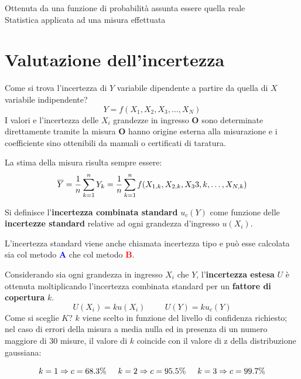 \documentclass[a4paper, 15pt]{article}
\begin{document}
\begin{adjustwidth}{2in}{}
	 	 \begin{tcolorbox}[colback=red!5!white,colframe=red!75!black,title=TIPO B]
	 	 	Ottenuta da una
	 	 	funzione di probabilità
	 	 	assunta essere quella reale \\
	 	 	Statistica applicata ad una misura effettuata
	 	 \end{tcolorbox}
\end{adjustwidth}
\section{Valutazione dell’incertezza}
\begin{adjustwidth}{2in}{}	 	 
 	 Come si trova l'incertezza di $Y$ variabile dipendente a partire da quella di $X$ variabile indipendente?
 	 \[Y = f(X_1, X_2, X_3, \dots, X_N)\]
 	 I valori e l'incertezza delle $X_i$ grandezze in ingresso \textbf{O} sono determinate direttamente tramite la misura \textbf{O} hanno origine esterna alla misurazione e i coefficiente sino ottenibili da manuali o certificati di taratura. \newline 
 	 
 	 La stima della misura risulta sempre essere:
 	 \[\overline{Y} = {1\over n}\sum_{k=1}^{n}Y_k = {1\over n}\sum_{k=1}^{n}f(X_{1,k}, X_{2,k}, X_3{3,k}, \dots, X_{N,k})\]
 	  	 	 
 	 Si definisce l'\textbf{incertezza combinata standard} $u_c(Y)$ come funzione delle \textbf{incertezze standard} relative ad ogni grandezza d'ingresso $u(X_i)$. 
 	 	
 	 L'incertezza standard viene anche chiamata incertezza tipo e può esse calcolata sia col metodo \textcolor{blue}{\textbf{A}} che col metodo \textcolor{red}{\textbf{B}}.\newline 
 	 
 	 Considerando sia ogni grandezza in ingresso $X_i$ che $Y$, l’\textbf{incertezza estesa} $U$ è ottenuta moltiplicando l’incertezza combinata standard per un \textbf{fattore di
 	 copertura} $ k $.
  	\[ U(X_i) = ku(X_i) \hspace{1cm} U(Y) = ku_c(Y)\]
 	 Come si sceglie $K$? $ k $ viene scelto in funzione del livello di confidenza richiesto; nel caso di errori della misura a media nulla ed in presenza di un numero
 	 maggiore di 30 misure, il valore di $ k $ coincide con il valore di z della
 	 distribuzione gaussiana:
 	 
 	 \[k=1 \Rightarrow c = 68.3\% \hspace{0.5cm} k=2 \Rightarrow c = 95.5\% \hspace{0.5cm} k=3 \Rightarrow c = 99.7\%\]
	

\end{adjustwidth}
\end{document}
